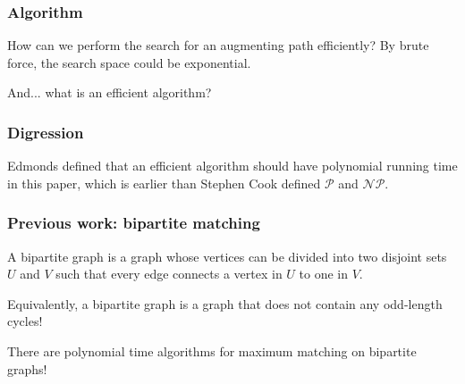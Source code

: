 \documentclass[hyperref={pdfpagelabels=false}]{beamer}
\begin{document}
\frame
{
	\frametitle{Algorithm}

	\large{
	How can we perform the search for an augmenting path efficiently? By brute force, the search space could be \alert{exponential}.
	
	\bigskip
	
	And... what is an \alert{efficient} algorithm?
	}
}

\frame
{
	\frametitle{Digression}

	\large{
	Edmonds defined that an efficient algorithm should have polynomial running time in this paper, which is earlier than Stephen Cook defined $\mathcal{P}$ and  $\mathcal{NP}$.
		
	}
}

\frame
{
	\frametitle{Previous work: bipartite matching}
	A bipartite graph is a graph whose vertices can be divided into two disjoint sets $U$ and $V$ such that every edge connects a vertex in $U$ to one in $V$.
	
	\bigskip
	
	Equivalently, a bipartite graph is a graph that does \alert{not} contain any \alert{odd-length} cycles!
	
	\bigskip
	
	There are polynomial time algorithms for maximum matching on bipartite graphs!
	
	\begin{center}
	\end{center}
}
\end{document}
